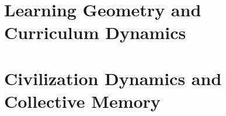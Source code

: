 \documentclass[
  12pt,
  twoside,
  openright,
  a4paper
]{book}
\begin{document}
\chapter{Learning Geometry and Curriculum Dynamics}


\chapter{Civilization Dynamics and Collective Memory}


\printbibliography[heading=bibintoc]
\printindex
\end{document}
